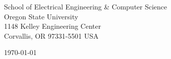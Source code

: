 \begin{minipage}{0.49\textwidth}
\begin{flushleft}
  \noindent
  School of Electrical Engineering \& Computer Science\\
Oregon State University\\
1148 Kelley Engineering Center\\
Corvallis, OR 97331-5501 USA
\end{flushleft}
\end{minipage}
\begin{minipage}{0.47\textwidth}
\begin{flushright}
\today
\end{flushright}
\end{minipage} \\

\newcommand{\univ}{Oregon State University}
\newcommand{\univshort}{Oregon State}
\newcommand{\degree}{M.Sc.}
\newcommand{\dept}{Computer Science}

